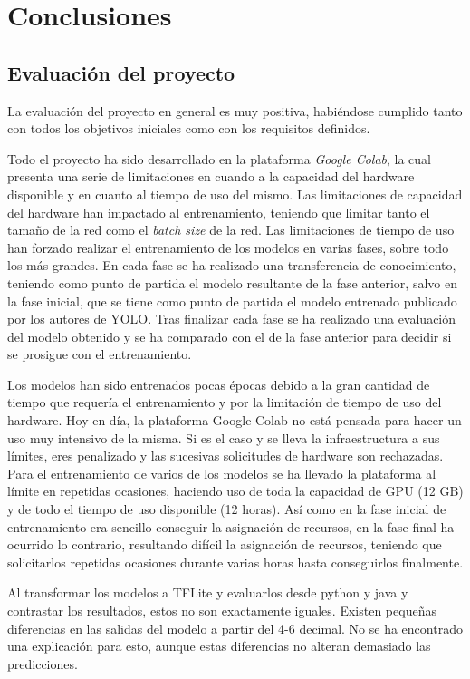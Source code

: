 \section{Conclusiones}
\label{sec:conclusiones}

\subsection{Evaluación del proyecto}

La evaluación del proyecto en general es muy positiva, habiéndose cumplido tanto con todos los objetivos iniciales como con los requisitos definidos.

Todo el proyecto ha sido desarrollado en la plataforma \textit{Google Colab}, la cual presenta una serie de limitaciones en cuando a la capacidad del hardware disponible y en cuanto al tiempo de uso del mismo. Las limitaciones de capacidad del hardware han impactado al entrenamiento, teniendo que limitar tanto el tamaño de la red como el \textit{batch size} de la red. Las limitaciones de tiempo de uso han forzado realizar el entrenamiento de los modelos en varias fases, sobre todo los más grandes. En cada fase se ha realizado una transferencia de conocimiento, teniendo como punto de partida el modelo resultante de la fase anterior, salvo en la fase inicial, que se tiene como punto de partida el modelo entrenado publicado por los autores de YOLO. Tras finalizar cada fase se ha realizado una evaluación del modelo obtenido y se ha comparado con el de la fase anterior para decidir si se prosigue con el entrenamiento.

Los modelos han sido entrenados pocas épocas debido a la gran cantidad de tiempo que requería el entrenamiento y por la limitación de tiempo de uso del hardware. Hoy en día, la plataforma Google Colab no está pensada para hacer un uso muy intensivo de la misma. Si es el caso y se lleva la infraestructura a sus límites, eres penalizado y las sucesivas solicitudes de hardware son rechazadas. Para el entrenamiento de varios de los modelos se ha llevado la plataforma al límite en repetidas ocasiones, haciendo uso de toda la capacidad de GPU (12 GB) y de todo el tiempo de uso disponible (12 horas). Así como en la fase inicial de entrenamiento era sencillo conseguir la asignación de recursos, en la fase final ha ocurrido lo contrario, resultando difícil la asignación de recursos, teniendo que solicitarlos repetidas ocasiones durante varias horas hasta conseguirlos finalmente.

Al transformar los modelos a TFLite y evaluarlos desde python y java y contrastar los resultados, estos no son exactamente iguales. Existen pequeñas diferencias en las salidas del modelo a partir del 4-6 decimal. No se ha encontrado una explicación para esto, aunque estas diferencias no alteran demasiado las predicciones.

